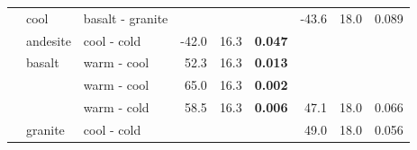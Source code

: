 \documentclass[english,man,floatsintext]{apa6}
\begin{document}
\begin{longtable}[t]{rllrrlrrl}
\nopagebreak
 & cool & basalt - granite &  &  &  & -43.6 & 18.0 & 0.089\\
\nopagebreak
 & andesite & cool - cold & -42.0 & 16.3 & \textbf{0.047} &  &  & \\
\nopagebreak
 & basalt & warm - cool & 52.3 & 16.3 & \textbf{0.013} &  &  & \\
\nopagebreak
 &  & warm - cool & 65.0 & 16.3 & \textbf{0.002} &  &  & \\
\nopagebreak
 &  & warm - cold & 58.5 & 16.3 & \textbf{0.006} & 47.1 & 18.0 & 0.066\\
\nopagebreak
\multirow[t]{-8}{*}{\raggedleft\arraybackslash 2019} & \multirow[t]{-3}{*}{\raggedright\arraybackslash granite} & cool - cold &  &  &  & 49.0 & 18.0 & 0.056\\
\bottomrule
\end{longtable}
\endgroup{}



\begingroup\fontsize{10}{12}\selectfont
\end{document}
